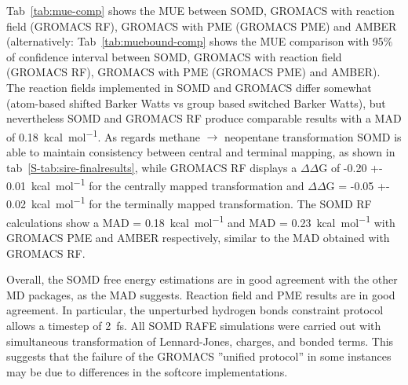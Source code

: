 \documentclass[journal=jctcce,manuscript=article]{achemso}
\begin{document}

Tab~\ref{tab:mue-comp} shows the MUE between SOMD, GROMACS with
reaction field (GROMACS RF), GROMACS with PME (GROMACS PME) and AMBER
(alternatively: Tab~\ref{tab:muebound-comp} shows the MUE comparison with
95$\%$ of confidence interval between SOMD, GROMACS with reaction
field (GROMACS RF), GROMACS with PME (GROMACS PME) and AMBER).
The reaction fields implemented in SOMD and GROMACS differ somewhat (atom-based shifted Barker Watts vs group based switched 
Barker Watts), but nevertheless SOMD and GROMACS RF produce comparable results with a MAD of 
\SI{0.18}{kcal.mol^{-1}}.
As regards methane $\rightarrow$ neopentane transformation SOMD is able to maintain consistency between 
central and terminal mapping, as shown in tab~\ref{S-tab:sire-finalresults}, 
while GROMACS RF displays a $\Delta\Delta$G of \SI{-0.20 +- 
0.01}{kcal.mol^{-1}} for the
centrally mapped transformation and $\Delta\Delta$G = \SI{-0.05 +- 
0.02}{kcal.mol^{-1}} for the terminally mapped transformation. 
The SOMD RF calculations show a MAD = \SI{0.18}{kcal.mol^{-1}} and 
MAD = \SI{0.23}{kcal.mol^{-1}} with GROMACS PME and AMBER respectively,
similar to the MAD obtained with GROMACS RF. 

Overall, the SOMD free energy estimations are in good agreement with the 
other MD packages, as the MAD suggests.  Reaction field and PME results are in 
good agreement.  In particular, the unperturbed hydrogen bonds constraint protocol 
allows a timestep of \SI{2}{fs}. All SOMD RAFE simulations were carried out 
with simultaneous transformation of Lennard-Jones, charges, and bonded terms. 
This suggests that the failure of the GROMACS ''unified protocol'' in some instances 
may be due to differences in the softcore implementations. 

\end{document}
